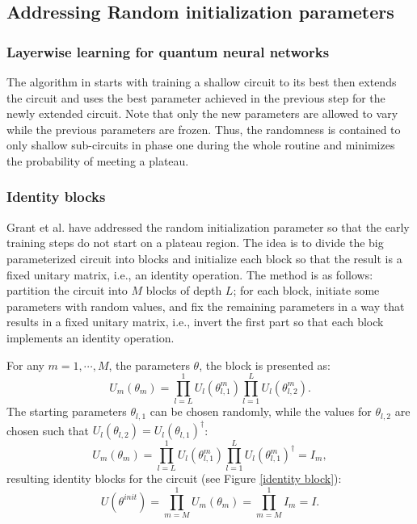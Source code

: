\subsection{Addressing Random initialization parameters}

\subsubsection{Layerwise learning for quantum neural networks}
The algorithm in \cite{skolikLayerwiseLearningQuantum2021} starts with training a shallow circuit to its best then extends the circuit and uses the best parameter achieved in the previous step for the newly extended circuit. 
Note that only the new parameters are allowed to vary while the previous parameters are frozen.
Thus, the randomness is contained to only shallow sub-circuits in phase one during the whole routine and minimizes the probability of meeting a plateau.


\subsubsection{Identity blocks}

Grant et al. \cite{grantInitializationStrategyAddressing2019} have addressed the random initialization parameter so that the early training steps do not start on a plateau region. 
The idea is to divide the big parameterized circuit into blocks and initialize each block so that the result is a fixed unitary matrix, i.e., an identity operation. 
The method is as follows: partition the circuit into $M$ blocks of depth $L$; for each block, initiate some parameters with random values, and fix the remaining parameters in a way that results in a fixed unitary matrix, i.e., invert the first part so that each block implements an identity operation.

For any $m = 1, \cdots, M$, the parameters $\theta$, the block is presented as:
\begin{equation}
    U_m(\theta_m)
    = \prod_{l=L}^1 U_l(\theta_{l,1}^m) \prod_{l=1}^L U_l(\theta_{l,2}^m).
\end{equation}
The starting parameters $\theta_{l,1}$ can be chosen randomly, while the values for $\theta_{l,2}$ are chosen such that $U_l(\theta_{l,2}) = U_l(\theta_{l,1})^\dagger$:
\begin{equation}
    U_m(\theta_m)
    = \prod_{l=L}^1 U_l(\theta_{l,1}^m)
    \prod_{l=1}^L U_l(\theta_{l,1}^m)^\dagger
    = I_m,
\end{equation}
resulting identity blocks for the circuit (see Figure \ref{identity block}):
\begin{equation}
    U(\theta^{init})
    = \prod_{m=M}^1 U_m(\theta_m)
    = \prod_{m=M}^1 I_m
    = I.
\end{equation}

